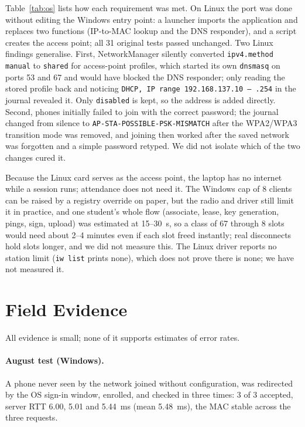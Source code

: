 \documentclass[11pt,a4paper]{article}
\newcommand{\code}[1]{\texttt{#1}}
\begin{document}
Table~\ref{tab:os} lists how each requirement was met. On Linux the port was done without editing the Windows entry point: a launcher imports the application and replaces two functions (IP-to-MAC lookup and the DNS responder), and a script creates the access point; all 31 original tests passed unchanged. Two Linux findings generalise. First, NetworkManager silently converted \code{ipv4.method manual} to \code{shared} for access-point profiles, which started its own \code{dnsmasq} on ports 53 and 67 and would have blocked the DNS responder; only reading the stored profile back and noticing \code{DHCP, IP range 192.168.137.10 -- .254} in the journal revealed it. Only \code{disabled} is kept, so the address is added directly. Second, phones initially failed to join with the correct password; the journal changed from silence to \code{AP-STA-POSSIBLE-PSK-MISMATCH} after the WPA2/WPA3 transition mode was removed, and joining then worked after the saved network was forgotten and a simple password retyped. We did not isolate which of the two changes cured it.

Because the Linux card serves as the access point, the laptop has no internet while a session runs; attendance does not need it. The Windows cap of 8 clients can be raised by a registry override on paper, but the radio and driver still limit it in practice, and one student's whole flow (associate, lease, key generation, pings, sign, upload) was estimated at 15--30~s, so a class of 67 through 8 slots would need about 2--4 minutes even if each slot freed instantly; real disconnects hold slots longer, and we did not measure this. The Linux driver reports no station limit (\code{iw list} prints none), which does not prove there is none; we have not measured it.

\section{Field Evidence}\label{sec:eval}
All evidence is small; none of it supports estimates of error rates.

\paragraph{August test (Windows).} A phone never seen by the network joined without configuration, was redirected by the OS sign-in window, enrolled, and checked in three times: 3 of 3 accepted, server RTT 6.00, 5.01 and 5.44~ms (mean 5.48~ms), the MAC stable across the three requests.
\end{document}
